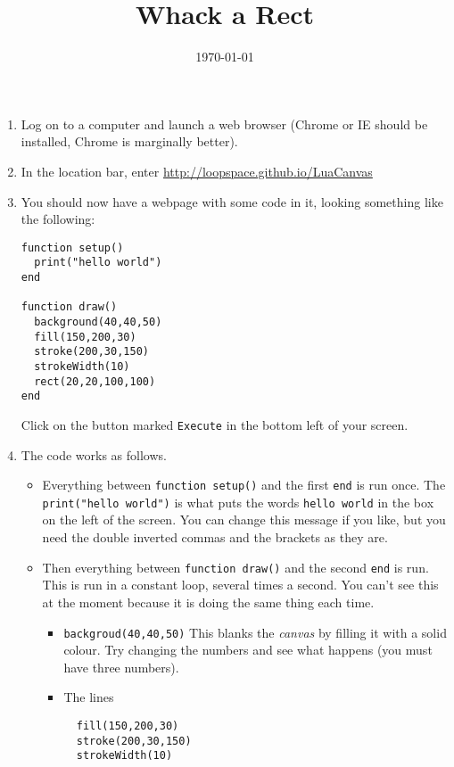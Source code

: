 \documentclass[
  xhtml,%
  text
]{internet}
\title{Whack a Rect}
\date{\today}
\begin{document}
\maketitle

\begin{enumerate}
\item Log on to a computer and launch a web browser (Chrome or IE should be installed, Chrome is marginally better).
\item In the location bar, enter \href{http://loopspace.github.io/LuaCanvas}{http://loopspace.github.io/LuaCanvas}
\item You should now have a webpage with some code in it, looking something like the following:

\begin{verbatim}
function setup()
  print("hello world")
end

function draw()
  background(40,40,50)
  fill(150,200,30)
  stroke(200,30,150)
  strokeWidth(10)
  rect(20,20,100,100)
end
\end{verbatim}

Click on the button marked \verb+Execute+ in the bottom left of your screen.

\item The code works as follows.

\begin{itemize}
\item Everything between \verb+function setup()+ and the first \verb+end+ is run once.
The \verb+print("hello world")+ is what puts the words \verb+hello world+ in the box on the left of the screen.
You can change this message if you like, but you need the double inverted commas and the brackets as they are.

\item Then everything between \verb+function draw()+ and the second \verb+end+ is run.
This is run in a constant loop, several times a second.
You can't see this at the moment because it is doing the same thing each time.

\begin{itemize}
\item \verb+backgroud(40,40,50)+ This blanks the \emph{canvas} by filling it with a solid colour.
Try changing the numbers and see what happens (you must have three numbers).

\item The lines

\begin{verbatim}
  fill(150,200,30)
  stroke(200,30,150)
  strokeWidth(10)
\end{verbatim}


\end{itemize}
\end{itemize}
\end{enumerate}
\end{document}
